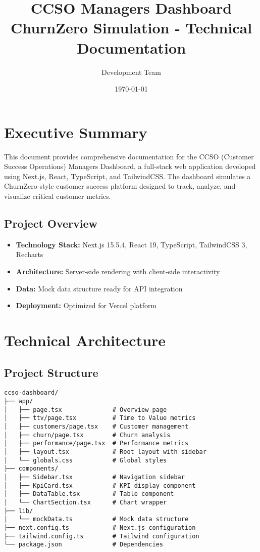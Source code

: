 \documentclass[12pt,a4paper]{article}
\title{\textbf{CCSO Managers Dashboard} \\ \large ChurnZero Simulation - Technical Documentation}
\author{Development Team}
\date{\today}
\begin{document}
\maketitle
\newpage

\tableofcontents
\newpage

\section{Executive Summary}

This document provides comprehensive documentation for the CCSO (Customer Success Operations) Managers Dashboard, a full-stack web application developed using Next.js, React, TypeScript, and TailwindCSS. The dashboard simulates a ChurnZero-style customer success platform designed to track, analyze, and visualize critical customer metrics.

\subsection{Project Overview}
\begin{itemize}
    \item \textbf{Technology Stack:} Next.js 15.5.4, React 19, TypeScript, TailwindCSS 3, Recharts
    \item \textbf{Architecture:} Server-side rendering with client-side interactivity
    \item \textbf{Data:} Mock data structure ready for API integration
    \item \textbf{Deployment:} Optimized for Vercel platform
\end{itemize}

\section{Technical Architecture}

\subsection{Project Structure}
\begin{verbatim}
ccso-dashboard/
├── app/
│   ├── page.tsx              # Overview page
│   ├── ttv/page.tsx          # Time to Value metrics
│   ├── customers/page.tsx    # Customer management
│   ├── churn/page.tsx        # Churn analysis
│   ├── performance/page.tsx  # Performance metrics
│   ├── layout.tsx            # Root layout with sidebar
│   └── globals.css           # Global styles
├── components/
│   ├── Sidebar.tsx           # Navigation sidebar
│   ├── KpiCard.tsx           # KPI display component
│   ├── DataTable.tsx         # Table component
│   └── ChartSection.tsx      # Chart wrapper
├── lib/
│   └── mockData.ts           # Mock data structure
├── next.config.ts            # Next.js configuration
├── tailwind.config.ts        # Tailwind configuration
└── package.json              # Dependencies
\end{verbatim}
\end{document}
